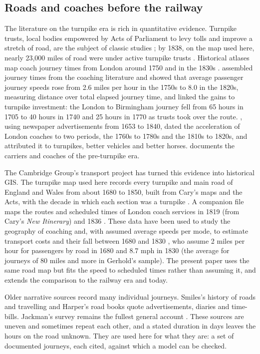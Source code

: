 \documentclass[11pt,a4paper]{article}
\begin{document}
\subsection{Roads and coaches before the railway}
The literature on the turnpike era is rich in quantitative evidence. Turnpike trusts, local bodies empowered by Acts of Parliament to levy tolls and improve a stretch of road, are the subject of classic studies \citep{albert1972,pawson1977}; by 1838, on the map used here, nearly 23,000 miles of road were under active turnpike trusts \citep{rosevear2023tp}. Historical atlases map coach journey times from London around 1750 and in the 1830s \citep{pope1989}. \citet{bogart2005} assembled journey times from the coaching literature and showed that average passenger journey speeds rose from 2.6 miles per hour in the 1750s to 8.0 in the 1820s, measuring distance over total elapsed journey time, and linked the gains to turnpike investment: the London to Birmingham journey fell from 65 hours in 1705 to 40 hours in 1740 and 25 hours in 1770 as trusts took over the route. \citet{gerhold2014}, using newspaper advertisements from 1653 to 1840, dated the acceleration of London coaches to two periods, the 1760s to 1780s and the 1810s to 1820s, and attributed it to turnpikes, better vehicles and better horses. \citet{gerhold2005} documents the carriers and coaches of the pre-turnpike era.

The Cambridge Group's transport project has turned this evidence into historical GIS. The turnpike map used here records every turnpike and main road of England and Wales from about 1680 to 1850, built from Cary's maps and the Acts, with the decade in which each section was a turnpike \citep{rosevear2023tp}. A companion file maps the routes and scheduled times of London coach services in 1819 (from Cary's \textit{New Itinerary}) and 1836 \citep{bates1969,rosevear2023coach}. These data have been used to study the geography of coaching \citep{rosevear2018} and, with assumed average speeds per mode, to estimate transport costs and their fall between 1680 and 1830 \citep{alvarez2017}, who assume 2 miles per hour for passengers by road in 1680 and 8.7 mph in 1830 (the average for journeys of 80 miles and more in Gerhold's sample). The present paper uses the same road map but fits the speed to scheduled times rather than assuming it, and extends the comparison to the railway era and today.

Older narrative sources record many individual journeys. Smiles's history of roads and travelling \citep{smiles1867} and Harper's road books \citep{harper1899,harper1902,harper1903,harper1922} quote advertisements, diaries and time-bills. Jackman's survey remains the fullest general account \citep{jackman1916}. These sources are uneven and sometimes repeat each other, and a stated duration in days leaves the hours on the road unknown. They are used here for what they are: a set of documented journeys, each cited, against which a model can be checked.
\end{document}
